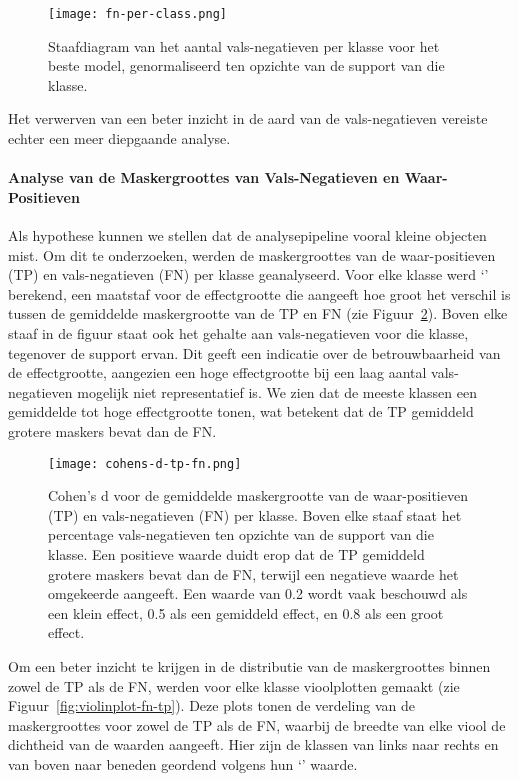 \begin{figure}[H]
  \centering
  \texttt{[image: fn-per-class.png]}
  \caption[]{\label{fig:fn-per-class}
    Staafdiagram van het aantal vals-negatieven per klasse voor het beste model, genormaliseerd ten opzichte van de support van die klasse.
  }
\end{figure}

Het verwerven van een beter inzicht in de aard van de vals-negatieven vereiste echter een meer diepgaande analyse.

\paragraph{Analyse van de Maskergroottes van Vals-Negatieven en Waar-Positieven}
Als hypothese kunnen we stellen dat de analysepipeline vooral kleine objecten mist. 
Om dit te onderzoeken, werden de maskergroottes van de waar-positieven (TP) en vals-negatieven (FN) per klasse geanalyseerd.
Voor elke klasse werd `' berekend, een maatstaf voor de effectgrootte die aangeeft hoe groot het verschil is tussen de gemiddelde maskergrootte van de TP en FN (zie Figuur~\ref{fig:cohens-d-fn-tp}).
Boven elke staaf in de figuur staat ook het gehalte aan vals-negatieven voor die klasse, tegenover de support ervan.
Dit geeft een indicatie over de betrouwbaarheid van de effectgrootte, aangezien een hoge effectgrootte bij een laag aantal vals-negatieven mogelijk niet representatief is.
We zien dat de meeste klassen een gemiddelde tot hoge effectgrootte tonen, wat betekent dat de TP gemiddeld grotere maskers bevat dan de FN.

\begin{figure}[H]
  \centering
  \texttt{[image: cohens-d-tp-fn.png]}
  \caption[]{\label{fig:cohens-d-fn-tp}
    Cohen's d voor de gemiddelde maskergrootte van de waar-positieven (TP) en vals-negatieven (FN) per klasse.
    Boven elke staaf staat het percentage vals-negatieven ten opzichte van de support van die klasse.
    Een positieve waarde duidt erop dat de TP gemiddeld grotere maskers bevat dan de FN, terwijl een negatieve waarde het omgekeerde aangeeft.
    Een waarde van 0.2 wordt vaak beschouwd als een klein effect, 0.5 als een gemiddeld effect, en 0.8 als een groot effect.
  }
\end{figure}

Om een beter inzicht te krijgen in de distributie van de maskergroottes binnen zowel de TP als de FN, werden voor elke klasse vioolplotten gemaakt (zie Figuur~\ref{fig:violinplot-fn-tp}).
Deze plots tonen de verdeling van de maskergroottes voor zowel de TP als de FN, waarbij de breedte van elke viool de dichtheid van de waarden aangeeft.
Hier zijn de klassen van links naar rechts en van boven naar beneden geordend volgens hun `' waarde.

